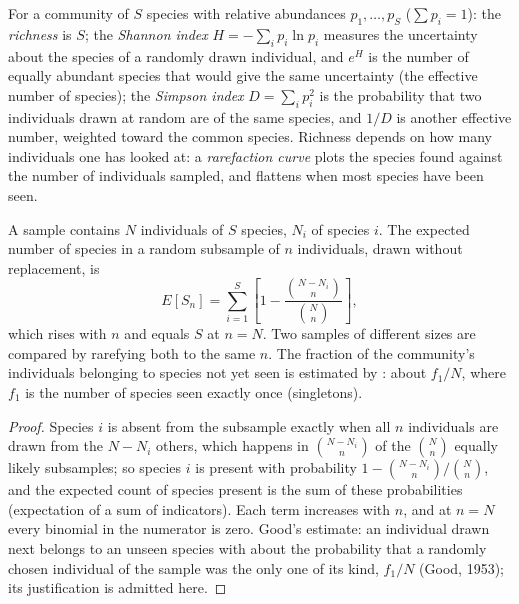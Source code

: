 \begin{definition}[Diversity]\label{def:b3:microbiomes:diversity}
For a community of $S$ species with relative abundances $p_{1},\dots,
p_{S}$ ($\sum p_{i} = 1$): the \emph{richness} is $S$; the
\emph{Shannon index} $H = -\sum_{i} p_{i}\ln p_{i}$ measures the
uncertainty about the species of a randomly drawn individual, and
$e^{H}$ is the number of equally abundant species that would give the
same uncertainty (the effective number of species); the \emph{Simpson
index} $D = \sum_{i} p_{i}^{2}$ is the probability that two individuals
drawn at random are of the same species, and $1/D$ is another
effective number, weighted toward the common species. Richness depends
on how many individuals one has looked at: a \emph{rarefaction curve}
plots the species found against the number of individuals sampled, and
flattens when most species have been seen.
\end{definition}

\begin{theorem}[Rarefaction]\label{thm:b3:microbiomes:rarefaction}
A sample contains $N$ individuals of $S$ species, $N_{i}$ of species
$i$. The expected number of species in a random subsample of $n$
individuals, drawn without replacement, is
\[
E[S_{n}] = \sum_{i=1}^{S}\left[1 - \frac{\binom{N - N_{i}}{n}}
{\binom{N}{n}}\right],
\]
which rises with $n$ and equals $S$ at $n = N$. Two samples of
different sizes are compared by rarefying both to the same $n$. The
fraction of the community's individuals belonging to species not yet
seen is estimated by \emph{}: about $f_{1}/N$, where
$f_{1}$ is the number of species seen exactly once (singletons).
\end{theorem}
\begin{proof}
Species $i$ is absent from the subsample exactly when all $n$
individuals are drawn from the $N - N_{i}$ others, which happens in
$\binom{N - N_{i}}{n}$ of the $\binom{N}{n}$ equally likely subsamples;
so species $i$ is present with probability $1 - \binom{N-N_{i}}{n}/
\binom{N}{n}$, and the expected count of species present is the sum of
these probabilities (expectation of a sum of indicators). Each term
increases with $n$, and at $n = N$ every binomial in the numerator is
zero. Good's estimate: an individual drawn next belongs to an unseen
species with about the probability that a randomly chosen individual
of the sample was the only one of its kind, $f_{1}/N$ (Good, 1953);
its justification is admitted here.
\end{proof}

